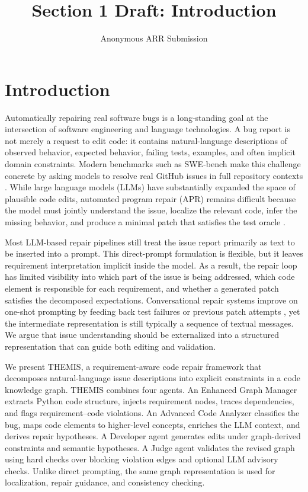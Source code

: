 \documentclass[11pt]{article}
\title{Section 1 Draft: Introduction}
\author{Anonymous ARR Submission}
\begin{document}
\maketitle

\section{Introduction}
\label{sec:introduction}

Automatically repairing real software bugs is a long-standing goal at the intersection of software engineering and language technologies.  A bug report is not merely a request to edit code: it contains natural-language descriptions of observed behavior, expected behavior, failing tests, examples, and often implicit domain constraints.  Modern benchmarks such as SWE-bench make this challenge concrete by asking models to resolve real GitHub issues in full repository contexts \citep{jimenez-etal-2024-swebench}.  While large language models (LLMs) have substantially expanded the space of plausible code edits, automated program repair (APR) remains difficult because the model must jointly understand the issue, localize the relevant code, infer the missing behavior, and produce a minimal patch that satisfies the test oracle \citep{monperrus-2018-automatic-repair-bibliography,jiang-etal-2023-code-lms-apr}.

Most LLM-based repair pipelines still treat the issue report primarily as text to be inserted into a prompt.  This direct-prompt formulation is flexible, but it leaves requirement interpretation implicit inside the model.  As a result, the repair loop has limited visibility into which part of the issue is being addressed, which code element is responsible for each requirement, and whether a generated patch satisfies the decomposed expectations.  Conversational repair systems improve on one-shot prompting by feeding back test failures or previous patch attempts \citep{xia-zhang-2023-conversational-apr,xia-etal-2024-chatrepair}, yet the intermediate representation is still typically a sequence of textual messages.  We argue that issue understanding should be externalized into a structured representation that can guide both editing and validation.

We present \textsc{THEMIS}, a requirement-aware code repair framework that decomposes natural-language issue descriptions into explicit constraints in a code knowledge graph.  THEMIS combines four agents.  An Enhanced Graph Manager extracts Python code structure, injects requirement nodes, traces dependencies, and flags requirement--code violations.  An Advanced Code Analyzer classifies the bug, maps code elements to higher-level concepts, enriches the LLM context, and derives repair hypotheses.  A Developer agent generates edits under graph-derived constraints and semantic hypotheses.  A Judge agent validates the revised graph using hard checks over blocking violation edges and optional LLM advisory checks.  Unlike direct prompting, the same graph representation is used for localization, repair guidance, and consistency checking.
\end{document}
